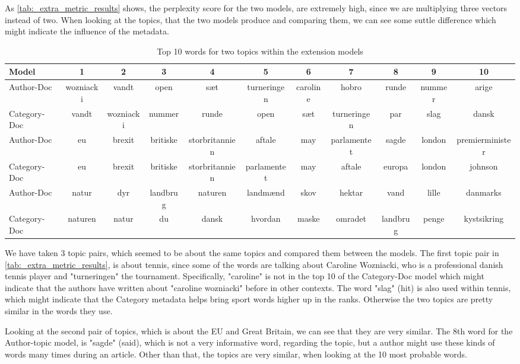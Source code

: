 As \autoref{tab:_extra_metric_results} shows, the perplexity score for the two models, are extremely high, since we are multiplying three vectors instead of two.
When looking at the topics, that the two models produce and comparing them, we can see some suttle difference which might indicate the influence of the metadata.
\begin{table}
		\centering
	\caption{Top 10 words for two topics within the extension models}
	\begin{tabular}{l|c|c|c|c|c|c|c|c|c|c}
		Model & 1 & 2 & 3 & 4 & 5 & 6 & 7 & 8 & 9 & 10 \\
		\midrule
		Author-Doc & wozniacki & vandt & open & sæt & turneringen & caroline & hobro & runde & nummer & arige \\
		Category-Doc & vandt & wozniacki & nummer & runde & open & sæt & turneringen & par & slag & dansk \\
		\midrule
		Author-Doc & eu & brexit & britiske & storbritannien & aftale & may & parlamentet & sagde & london & premierminister \\
		Category-Doc & eu & brexit & britiske & storbritannien & parlamentet & may & aftale & europa & london & johnson \\
		\midrule
		Author-Doc & natur & dyr & landbrug & naturen & landmænd & skov & hektar & vand & lille & danmarks \\
		Category-Doc & naturen & natur & du & dansk & hvordan & maske & omradet & landbrug & penge & kystsikring \\
	\end{tabular}
	\label{tab:_extra_metric_results}
\end{table}
We have taken 3 topic pairs, which seemed to be about the same topics and compared them between the models.
The first topic pair in \autoref{tab:_extra_metric_results}, is about tennis, since some of the words are talking about Caroline Wozniacki, who is a professional danish tennis player and "turneringen" the tournament.
Specifically, "caroline" is not in the top 10 of the Category-Doc model which might indicate that the authors have written about "caroline wozniacki" before in other contexts.
The word "slag" (hit) is also used within tennis, which might indicate that the Category metadata helps bring sport words higher up in the ranks.
Otherwise the two topics are pretty similar in the words they use.

Looking at the second pair of topics, which is about the EU and Great Britain, we can see that they are very similar.
The 8th word for the Author-topic model, is "sagde" (said), which is not a very informative word, regarding the topic, but a author might use these kinds of words many times during an article.
Other than that, the topics are very similar, when looking at the 10 most probable words.

